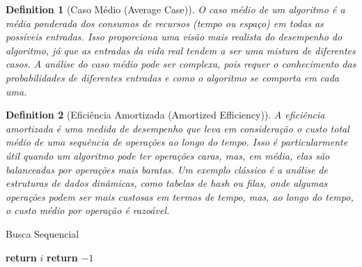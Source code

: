 \documentclass{article}
\newtheorem{definition}{Definition}[section]
\begin{document}
\begin{definition}[Caso Médio (Average Case)]
O caso médio de um algoritmo é a média ponderada dos consumos de recursos (tempo ou espaço) em todas as possíveis entradas. Isso proporciona uma visão mais realista do desempenho do algoritmo, já que as entradas da vida real tendem a ser uma mistura de diferentes casos. A análise do caso médio pode ser complexa, pois requer o conhecimento das probabilidades de diferentes entradas e como o algoritmo se comporta em cada uma.
\end{definition}

\begin{definition}[Eficiência Amortizada (Amortized Efficiency)]
A eficiência amortizada é uma medida de desempenho que leva em consideração o custo total médio de uma sequência de operações ao longo do tempo. Isso é particularmente útil quando um algoritmo pode ter operações caras, mas, em média, elas são balanceadas por operações mais baratas. Um exemplo clássico é a análise de estruturas de dados dinâmicas, como tabelas de hash ou filas, onde algumas operações podem ser mais custosas em termos de tempo, mas, ao longo do tempo, o custo médio por operação é razoável.
\end{definition}


\begin{algorithm}
\caption{Busca Sequencial}
\begin{algorithmic}[1]
            \State \textbf{return} $i$ 
        \EndIf
    \EndFor
    \State \textbf{return} $-1$ 
\EndFunction
\end{algorithmic}
\end{algorithm}


% 
\end{document}
